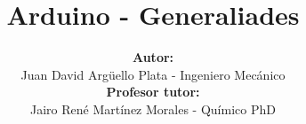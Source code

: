 \documentclass[20]{beamer}
\title[ACMA]{\textbf{Arduino - Generaliades}}
\author[Juan David]{
\textbf{Autor:}\\
Juan David Argüello Plata - Ingeniero Mecánico\\
\vspace{5pt}
\textbf{Profesor tutor:}\\
Jairo René Martínez Morales - Químico PhD
}
\institute[UIS]{
	CENIVAM\\
	Universidad Industrial de Santander
}
\date{}
\begin{document}
\begin{frame}
\titlepage
\end{frame}










\end{document}
